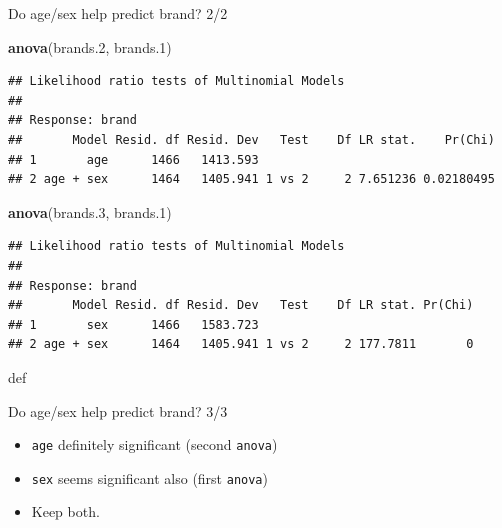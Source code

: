 \documentclass[ignorenonframetext,]{beamer}
\newenvironment{Shaded}{\begin{snugshade}}{\end{snugshade}}
\newcommand{\FloatTok}[1]{\textcolor[rgb]{0.00,0.00,0.81}{#1}}
\newcommand{\KeywordTok}[1]{\textcolor[rgb]{0.13,0.29,0.53}{\textbf{#1}}}
\newcommand{\NormalTok}[1]{#1}
\begin{document}
\begin{frame}[fragile]{Do age/sex help predict brand? 2/2}
\protect\hypertarget{do-agesex-help-predict-brand-22}{}

\begin{Shaded}
\begin{Highlighting}[]
\KeywordTok{anova}\NormalTok{(brands}\FloatTok{.2}\NormalTok{, brands}\FloatTok{.1}\NormalTok{)}
\end{Highlighting}
\end{Shaded}

\begin{verbatim}
## Likelihood ratio tests of Multinomial Models
## 
## Response: brand
##       Model Resid. df Resid. Dev   Test    Df LR stat.    Pr(Chi)
## 1       age      1466   1413.593                                 
## 2 age + sex      1464   1405.941 1 vs 2     2 7.651236 0.02180495
\end{verbatim}

\begin{Shaded}
\begin{Highlighting}[]
\KeywordTok{anova}\NormalTok{(brands}\FloatTok{.3}\NormalTok{, brands}\FloatTok{.1}\NormalTok{)}
\end{Highlighting}
\end{Shaded}

\begin{verbatim}
## Likelihood ratio tests of Multinomial Models
## 
## Response: brand
##       Model Resid. df Resid. Dev   Test    Df LR stat. Pr(Chi)
## 1       sex      1466   1583.723                              
## 2 age + sex      1464   1405.941 1 vs 2     2 177.7811       0
\end{verbatim}

def

\end{frame}

\begin{frame}[fragile]{Do age/sex help predict brand? 3/3}
\protect\hypertarget{do-agesex-help-predict-brand-33}{}

\begin{itemize}
\item
  \texttt{age} definitely significant (second \texttt{anova})
\item
  \texttt{sex} seems significant also (first \texttt{anova})
\item
  Keep both.
\end{itemize}

\end{frame}
\end{document}

